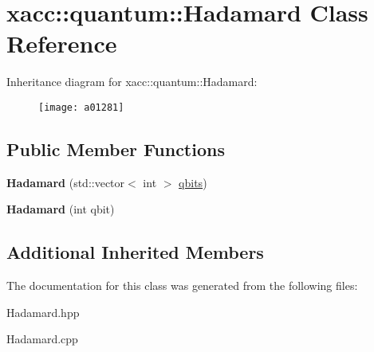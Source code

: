 \hypertarget{a01281}{}\section{xacc\+:\+:quantum\+:\+:Hadamard Class Reference}
\label{a01281}
Inheritance diagram for xacc\+:\+:quantum\+:\+:Hadamard\+:\begin{figure}[H]
\begin{center}
\leavevmode
\texttt{[image: a01281]}
\end{center}
\end{figure}
\subsection*{Public Member Functions}
\begin{DoxyCompactItemize}
\item 
\mbox{\label{a01281_a1f26925eeb4a52ca7e52dd9158fe7005}} 
{\bfseries Hadamard} (std\+::vector$<$ int $>$ \hyperlink{a01253_a2a56be6c2519ea65df4d06f4abae1393}{qbits})
\item 
\mbox{\label{a01281_aac4e06aae35583bcce39b6b178948364}} 
{\bfseries Hadamard} (int qbit)
\end{DoxyCompactItemize}
\subsection*{Additional Inherited Members}


The documentation for this class was generated from the following files\+:\begin{DoxyCompactItemize}
\item 
Hadamard.\+hpp\item 
Hadamard.\+cpp\end{DoxyCompactItemize}
